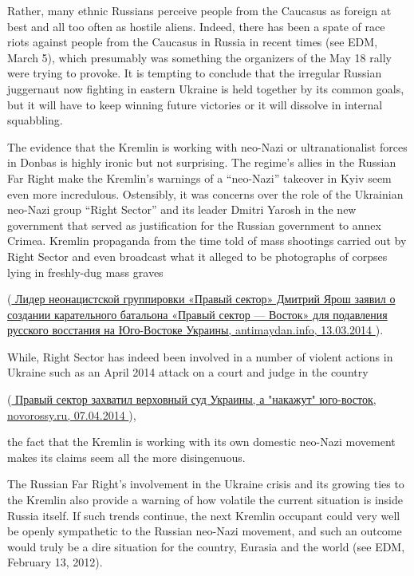 \begin{itemize}
\begin{itemize}
\begin{multicols}{2}
Rather, many ethnic Russians perceive people from the
Caucasus as foreign at best and all too often as hostile aliens. Indeed, there
has been a spate of race riots against people from the Caucasus in Russia in
recent times (see EDM, March 5), which presumably was something the organizers
of the May 18 rally were trying to provoke. It is tempting to conclude that the
irregular Russian juggernaut now fighting in eastern Ukraine is held together
by its common goals, but it will have to keep winning future victories or it
will dissolve in internal squabbling.

The evidence that the Kremlin is working with neo-Nazi or ultranationalist
forces in Donbas is highly ironic but not surprising. The regime’s allies in
the Russian Far Right make the Kremlin’s warnings of a \enquote{neo-Nazi} takeover in
Kyiv seem even more incredulous. Ostensibly, it was concerns over the role of
the Ukrainian neo-Nazi group \enquote{Right Sector} and its leader Dmitri Yarosh in the
new government that served as justification for the Russian government to annex
Crimea. Kremlin propaganda from the time told of mass shootings carried out by
Right Sector and even broadcast what it alleged to be photographs of corpses
lying in freshly-dug mass graves

(\href{http://antimaydan.info/2014/03/lider_neonacistskoj_gruppirovki_pravyj_sektor_dmitrij_yarosh_zayavil__37446.html}{%
Лидер неонацистской группировки «Правый сектор» Дмитрий Ярош заявил о создании карательного батальона «Правый сектор — Восток» для подавления русского восстания на Юго-Востоке Украины, antimaydan.info, 13.03.2014%
}).

While, Right Sector has indeed been involved in a number of violent actions in
Ukraine such as an April 2014 attack on a court and judge in the country

(\href{http://novorossy.ru/news/news_post/pravyy-sektor-zahvatil-verhovnyy-sud-ukrainy-a-nakazhut-yugo}{%
Правый сектор захватил верховный суд Украины, а "накажут" юго-восток, novorossy.ru, 07.04.2014%
}),

the fact that the Kremlin is working with its own domestic neo-Nazi movement
makes its claims seem all the more disingenuous.

The Russian Far Right’s involvement in the Ukraine crisis and its growing ties
to the Kremlin also provide a warning of how volatile the current situation is
inside Russia itself. If such trends continue, the next Kremlin occupant could
very well be openly sympathetic to the Russian neo-Nazi movement, and such an
outcome would truly be a dire situation for the country, Eurasia and the world
(see EDM, February 13, 2012).
\end{multicols}


\end{itemize}
\end{itemize}
